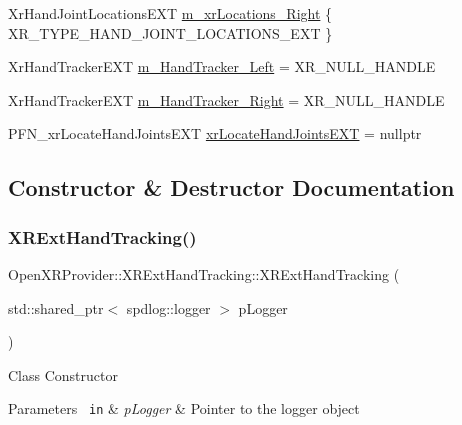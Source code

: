 \begin{DoxyCompactItemize}
\item 
Xr\+Hand\+Joint\+Locations\+E\+XT \mbox{\hyperlink{class_open_x_r_provider_1_1_x_r_ext_hand_tracking_a2cfb06358c45a4ba3212b999a15a06c2}{m\+\_\+xr\+Locations\+\_\+\+Right}} \{ X\+R\+\_\+\+T\+Y\+P\+E\+\_\+\+H\+A\+N\+D\+\_\+\+J\+O\+I\+N\+T\+\_\+\+L\+O\+C\+A\+T\+I\+O\+N\+S\+\_\+\+E\+XT \}
\item 
Xr\+Hand\+Tracker\+E\+XT \mbox{\hyperlink{class_open_x_r_provider_1_1_x_r_ext_hand_tracking_abe141459915e99f8159b5cd403f06c4f}{m\+\_\+\+Hand\+Tracker\+\_\+\+Left}} = X\+R\+\_\+\+N\+U\+L\+L\+\_\+\+H\+A\+N\+D\+LE
\item 
Xr\+Hand\+Tracker\+E\+XT \mbox{\hyperlink{class_open_x_r_provider_1_1_x_r_ext_hand_tracking_af2ade7e894fea5037cf94376046c911f}{m\+\_\+\+Hand\+Tracker\+\_\+\+Right}} = X\+R\+\_\+\+N\+U\+L\+L\+\_\+\+H\+A\+N\+D\+LE
\item 
P\+F\+N\+\_\+xr\+Locate\+Hand\+Joints\+E\+XT \mbox{\hyperlink{class_open_x_r_provider_1_1_x_r_ext_hand_tracking_a823fb0d1b4db88a56f2151021d3f4e59}{xr\+Locate\+Hand\+Joints\+E\+XT}} = nullptr
\end{DoxyCompactItemize}


\subsection{Constructor \& Destructor Documentation}
\mbox{\label{class_open_x_r_provider_1_1_x_r_ext_hand_tracking_ae93fec1405449c8a6f6027f82d869d44}} 
\subsubsection{\texorpdfstring{XRExtHandTracking()}{XRExtHandTracking()}}
{\footnotesize\ttfamily Open\+X\+R\+Provider\+::\+X\+R\+Ext\+Hand\+Tracking\+::\+X\+R\+Ext\+Hand\+Tracking (\begin{DoxyParamCaption}\item[{std\+::shared\+\_\+ptr$<$ spdlog\+::logger $>$}]{p\+Logger }\end{DoxyParamCaption})}

Class Constructor 
\begin{DoxyParams}[1]{Parameters}
\mbox{\texttt{ in}}  & {\em p\+Logger} & Pointer to the logger object \\
\hline
\end{DoxyParams}
\mbox{\label{class_open_x_r_provider_1_1_x_r_ext_hand_tracking_a3a23c2516160d65a98d3323d4bdb9959}} 
